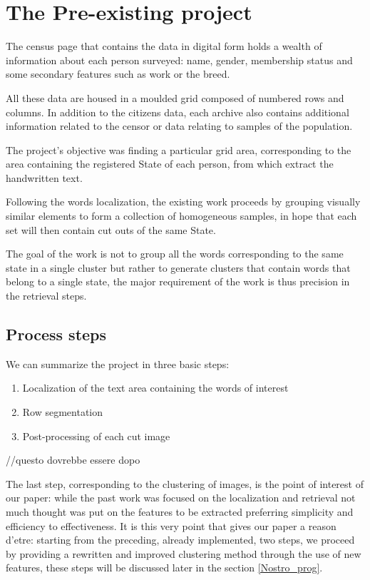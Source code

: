\section{The Pre-existing project}

The census page that contains the data in digital form holds a wealth of information about each person surveyed: name, gender, membership status and some secondary features such as work or the breed. 

All these data are housed in a moulded grid composed of numbered rows and columns. In addition to the citizens data, each archive also contains additional information related to the censor or data relating to samples of the population.

The project's objective was finding a particular grid area, corresponding to the area containing the registered State of each person, from which extract the handwritten text.

Following the words localization, the existing work proceeds by grouping visually similar elements to form a collection of homogeneous samples, in hope that each set will then contain cut outs of the same State.

The goal of the work is not to group all the words corresponding to the same state in a single cluster but rather to generate clusters that contain words that belong to a single state, the major requirement of the work is thus precision in the retrieval steps.

\subsection{Process steps}

We can summarize the project in three basic steps:
\begin{enumerate}
\item Localization of the text area containing the words of interest
\item Row segmentation
\item Post-processing of each cut image
\end{enumerate}

//questo dovrebbe essere dopo

The last step, corresponding to the clustering of images, is the point of interest of our paper: while the past work was focused on the localization and retrieval not much thought was put on the features to be extracted preferring simplicity and efficiency to effectiveness.
It is this very point that gives our paper a reason d'etre: starting from the preceding, already implemented, two steps, we proceed by providing a rewritten and improved clustering method through the use of new features, these steps will be discussed later in the section \ref{Nostro_prog}.

